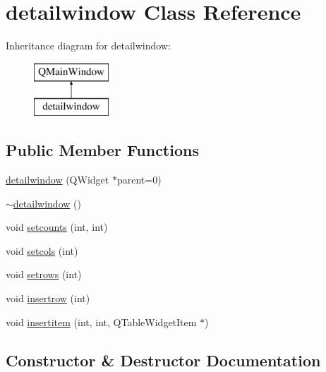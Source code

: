 \hypertarget{classdetailwindow}{}\section{detailwindow Class Reference}
\label{classdetailwindow}
Inheritance diagram for detailwindow\+:\begin{figure}[H]
\begin{center}
\leavevmode
\includegraphics[height=2.000000cm]{classdetailwindow}
\end{center}
\end{figure}
\subsection*{Public Member Functions}
\begin{DoxyCompactItemize}
\item 
\hyperlink{classdetailwindow_abedfe426704c69d9fb1dd01870fdc47b}{detailwindow} (Q\+Widget $\ast$parent=0)
\item 
\hyperlink{classdetailwindow_a4423d1b152631ad2bb6838b3a77f0315}{$\sim$detailwindow} ()
\item 
void \hyperlink{classdetailwindow_adfcea879c00c9905840988e777f809b3}{setcounts} (int, int)
\item 
void \hyperlink{classdetailwindow_acc6d6b4b1ab5141927c6acddf36f43ff}{setcols} (int)
\item 
void \hyperlink{classdetailwindow_a574edec5e903abfe41cf47db896c5f20}{setrows} (int)
\item 
void \hyperlink{classdetailwindow_a961ee64e60bff473f929629f9335518f}{insertrow} (int)
\item 
void \hyperlink{classdetailwindow_ab64a227e7c07e5dc17e7a0a29675544a}{insertitem} (int, int, Q\+Table\+Widget\+Item $\ast$)
\end{DoxyCompactItemize}


\subsection{Constructor \& Destructor Documentation}
\mbox{\label{classdetailwindow_abedfe426704c69d9fb1dd01870fdc47b}} 

